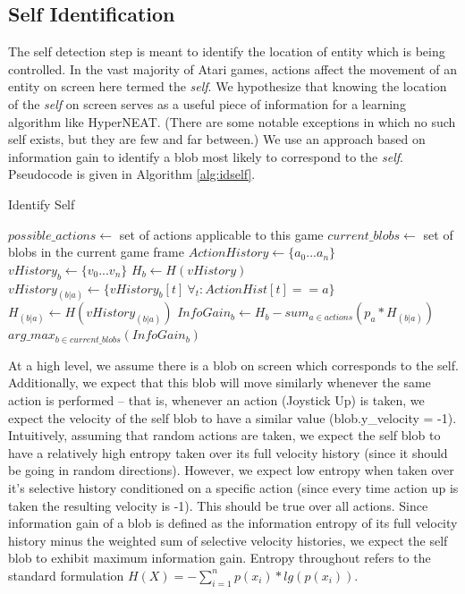 \documentclass{acm_proc_article-sp}
\begin{document}
\subsection{Self Identification}
The self detection step is meant to identify the location of entity which is being controlled. In the vast majority of Atari games, actions affect the movement of an entity on screen here termed the \textit{self}. We hypothesize that knowing the location of the \textit{self} on screen serves as a useful piece of information for a learning algorithm like HyperNEAT. (There are some notable exceptions in which no such self exists, but they are few and far between.) We use an approach based on information gain to identify a blob most likely to correspond to the \textit{self}. Pseudocode is given in Algorithm \ref{alg:idself}.

\begin{algorithm}
\caption{Identify Self}
\label{alg:idself}
\begin{algorithmic}
  \STATE $possible\_actions \leftarrow $ set of actions applicable to this game
  \STATE $current\_blobs \leftarrow $ set of blobs in the current game frame
  \STATE $ActionHistory \leftarrow \{a_0...a_n\}$ 
  \STATE $vHistory_b \leftarrow \{v_0...v_n\}$ 
  \STATE $H_b \leftarrow H(vHistory)$ 
  \STATE $vHistory_{(b|a)} \leftarrow \{vHistory_b[t] ~\forall_t: ActionHist[t] == a\}$ 
  \STATE $H_{(b|a)} \leftarrow H(vHistory_{(b|a)})$ 
  \ENDFOR
  \STATE $InfoGain_b \leftarrow H_b - sum_{a \in actions}(p_a * H_{(b|a)})$  
  \ENDFOR
  \RETURN $arg\_max_{b \in current\_blobs}(InfoGain_b)$ 
\end{algorithmic}
\end{algorithm}

At a high level, we assume there is a blob on screen which corresponds to the self. Additionally, we expect that this blob will move similarly whenever the same action is performed -- that is, whenever an action (Joystick Up) is taken, we expect the velocity of the self blob to have a similar value (blob.y\_velocity = -1). Intuitively, assuming that random actions are taken, we expect the self blob to have a relatively high entropy taken over its full velocity history (since it should be going in random directions). However, we expect low entropy when taken over it's selective history conditioned on a specific action (since every time action up is taken the resulting velocity is -1). This should be true over all actions. Since information gain of a blob is defined as the information entropy of its full velocity history minus the weighted sum of selective velocity histories, we expect the self blob to exhibit maximum information gain. Entropy throughout refers to the standard formulation $H(X) = -\sum_{i=1}^n{p(x_i)*lg(p(x_i))}$.
\end{document}
